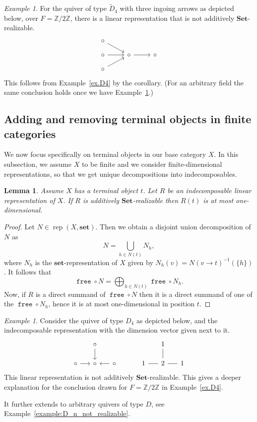 \documentclass[a4paper]{amsart}
\theoremstyle{plain}
\newtheorem{lemma}[theorem]{Lemma}
\theoremstyle{definition}
\theoremstyle{remark}
\newtheorem{example}[theorem]{Example}
\newcommand{\funct}[1]{\operatorname{\mathtt{#1}}}
\newcommand{\Set}{\mathbf{Set}}
\newcommand{\set}{\mathbf{set}}
\newcommand{\Z}{\mathbb{Z}}
\DeclareMathOperator{\rep}{rep}
\begin{document}
\begin{example}
For the quiver of type \( \tilde{D}_4 \) with three ingoing arrows as depicted below, over \( F = \Z / 2\Z \), there is a linear representation that is not additively \( \Set \)-realizable.
\[ \begin{tikzcd}[row sep=3mm]
\circ \ar[rd] \\
\circ \ar[r] & \circ \ar[r] & \circ \\
\circ \ar[ru]
\end{tikzcd} \]
This follows from Example~\ref{ex.D4} by the corollary. (For an arbitrary field the same conclusion holds once we have Example~\ref{ex.D4_inward}.)
\end{example}

\subsection{Adding and removing terminal objects in finite categories}
\label{sec:terminalobj}

We now focus specifically on terminal objects in our base category \( X \). In this subsection, we assume \( X \) to be finite and we consider finite-dimensional representations, so that we get unique decompositions into indecomposables.

\begin{lemma} \label{lem.terminal_is_1d}
Assume \( X \) has a terminal object \( t \). Let \( R \) be an indecomposable linear representation of \( X \). If \( R \) is additively \( \Set \)-realizable then \( R(t) \) is at most one-dimensional.
\end{lemma}

\begin{proof}
Let \( N\in\rep(X, \set)\). Then we obtain a disjoint union decomposition of \( N \) as
\[ N = \bigcup_{h \in N(t)} N_h, \]
where $N_h$ is the \(\set\)-representation of $X$ given by \( N_h(v) = N(v \to t)^{-1}(\{h\}) \). It follows that
\[ \funct{free} \circ N = \bigoplus_{h \in N(t)} \funct{free} \circ N_h. \]
Now, if \( R\) is a direct summand of \( \funct{free} \circ N \) then it is a direct summand of one of the \( \funct{free} \circ N_h \), hence it is at most one-dimensional in position \( t \).
\end{proof}

\begin{example} \label{ex.D4_inward}
Consider the quiver of type \( D_4 \) as depicted below, and the indecomposable representation with the dimension vector given next to it.
\[ \begin{tikzcd}[sep=5mm]
& \circ \ar[d] &&&& 1 \ar[d,-] & \\
\circ \ar[r] & \circ & \circ \ar[l] && 1 \ar[r,-] & 2 & 1\ar[l,-]
\end{tikzcd} \]
This linear representation is not additively \( \Set \)-realizable. This gives a deeper explanation for the conclusion drawn for $F=\Z/2\Z$ in Example~\ref{ex.D4}.

It further extends to arbitrary quivers of type \( D \), see Example~\ref{example:D_n_not_realizable}.
\end{example}
\end{document}
